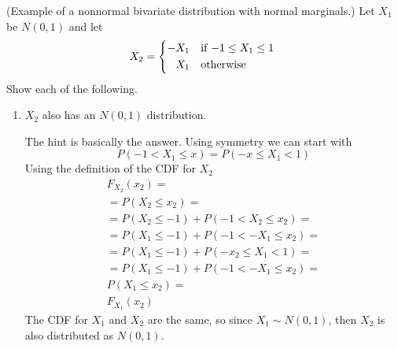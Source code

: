 (Example of a nonnormal bivariate distribution with normal marginals.) Let $X_1$ be $N(0,1)$ and let
\[
  X_2
  =
  \begin{cases*}
    -X_1 & if $-1 \leq X_1 \leq 1$ \\
    \phantom{-}X_1 & otherwise
  \end{cases*}
\]
Show each of the following.
\begin{enumerate}[label= (\alph*)]
    \item $X_2$ also has an $N(0,1)$ distribution.
    \par
    The hint is basically the answer. Using symmetry we can start with
    \[
      P (-1 < X_1 \leq x)
      =
      P(-x \leq X_1 < 1)
    \]
    Using the definition of the CDF for $X_2$
    \begin{align*}
      F_{X_2}(x_2)
      =
      \\
      =
      P (X_2 \leq x_2)
      =
      \\
      =
      P (X_2 \leq -1)
      +
      P (-1 < X_2 \leq x_2)
      = 
      \\
      =
      P (X_1 \leq -1)
      +
      P (-1 < -X_1 \leq x_2)
      = \tag*{Using the definition of $X_2$.}
      \\
      =
      P (X_1 \leq -1)
      +
      P (-x_2 \leq X_1 < 1)
      =
      \\
      =
      P (X_1 \leq -1)
      +
      P (-1 < -X_1 \leq x_2)
      = \tag*{Using symmetry argument.}
      \\
      P (X_1 \leq x_2) \tag*{CDF definition for $X_1$.}
      =
      \\
      F_{X_1}(x_2)
    \end{align*}
    The CDF for $X_1$ and $X_2$ are the same, so since $X_1 \sim N(0,1)$, then $X_2$ is also distributed as $N(0,1)$.
    

\end{enumerate}
